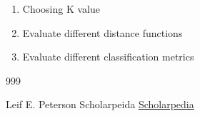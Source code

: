 \documentclass{report}
\begin{document}
\begin{enumerate}

\item Choosing K value

\item Evaluate different distance functions

\item Evaluate different classification metrics

\end{enumerate}

\begin {thebibliography}{999}

	Leif E. Peterson
	Scholarpeida
	\href{http://www.scholarpedia.org/article/K-nearest_neighbor}{Scholarpedia}
	
\end{thebibliography}
\end{document}
